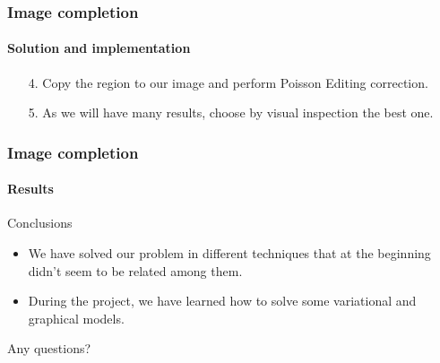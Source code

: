 \documentclass[11pt]{beamer}
\begin{document}
\begin{frame}
\frametitle{Image completion}
\framesubtitle{Solution and implementation}
\begin{itemize}
\item [4.] Copy the region to our image and perform Poisson Editing correction.
\item [5.] As we will have many results, choose by visual inspection the best one.
\end{itemize}
\end{frame}

\begin{frame}
\frametitle{Image completion}
\framesubtitle{Results}

\end{frame}


\begin{frame}{Conclusions}
\begin{itemize}
\item We have solved our problem in different techniques that at the beginning didn't seem to be related among them.
\item During the project, we have learned how to solve some variational and graphical models.

\end{itemize}
\end{frame}

\begin{frame}
\begin{block}{}
\centering
\Large Any questions?
\end{block}
\end{frame}
\end{document}
